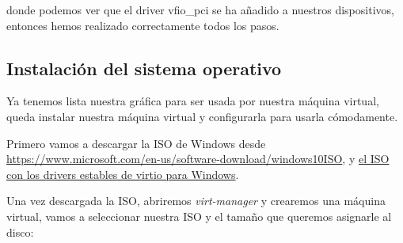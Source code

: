\documentclass[12pt]{article}
\begin{document}
donde podemos ver que el driver vfio\_pci se ha añadido a nuestros dispositivos, entonces hemos realizado correctamente todos los pasos.

\subsection{Instalación del sistema operativo}

Ya tenemos lista nuestra gráfica para ser usada por nuestra máquina virtual, queda instalar nuestra máquina virtual y configurarla para usarla cómodamente.

Primero vamos a descargar la ISO de Windows desde \href{https://www.microsoft.com/en-us/software-download/windows10ISO}{https://www.microsoft.com/en-us/software-download/windows10ISO}, y \href{https://github.com/virtio-win/virtio-win-pkg-scripts/blob/master/README.md}{el ISO con los drivers estables de virtio para Windows}.

Una vez descargada la ISO, abriremos \emph{virt-manager} y crearemos una máquina virtual, vamos a seleccionar nuestra ISO y el tamaño que queremos asignarle al disco:
\end{document}
